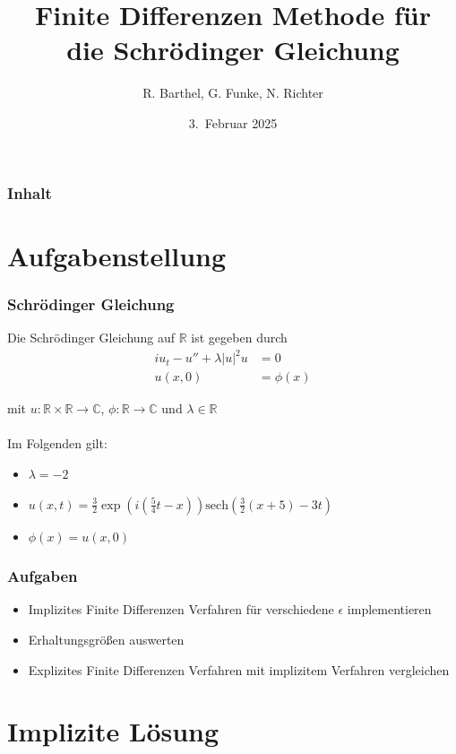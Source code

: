 \documentclass{beamer}
\author[Barthel, Funke, Richter]{R. Barthel, G. Funke, N. Richter}
\title[Finite Differenzen Methode f\"ur die Schr\"odinger Gleichung]{Finite Differenzen Methode f\"ur\\ die Schr\"odinger Gleichung}
\institute[Numerik-Praktikum 24/25]{Numerisches Praktikum\\
                    WS 2024/2025\\
                      Universit\"at Leipzig}
\date[WS 2025]{3.\ Februar 2025}
\begin{document}
\frame{\titlepage}

\begin{frame}
\frametitle{Inhalt}
\tableofcontents
\end{frame}

\section{Aufgabenstellung}

\begin{frame}
    \frametitle{Schrödinger Gleichung}

    Die Schrödinger Gleichung auf $\mathbb{R}$ ist gegeben durch
    \begin{align*}
        iu_t - u'' + \lambda |u|^2u &= 0 \\
        u(x,0) &= \phi(x)
    \end{align*}
    
    mit $u:\mathbb{R}\times\mathbb{R}\to\mathbb{C}$, $\phi:\mathbb{R}\to\mathbb{C}$ und $\lambda\in\mathbb{R}$\\
    \ \\
    Im Folgenden gilt:
    \begin{itemize}
        \item $\lambda = -2$
        \item $u(x,t)=\frac{3}{2}\exp(i(\frac{5}{4}t-x))\text{sech}(\frac{3}{2}(x+5)-3t)$
        \item $\phi(x)=u(x,0)$
    \end{itemize}
\end{frame}

\begin{frame}
    \frametitle{Aufgaben}
    \begin{itemize}
        \item Implizites Finite Differenzen Verfahren für verschiedene $\epsilon$ implementieren
        \item Erhaltungsgrößen auswerten
        \item Explizites Finite Differenzen Verfahren mit implizitem Verfahren vergleichen
    \end{itemize}
    
\end{frame}

\section{Implizite Lösung}
\end{document}
